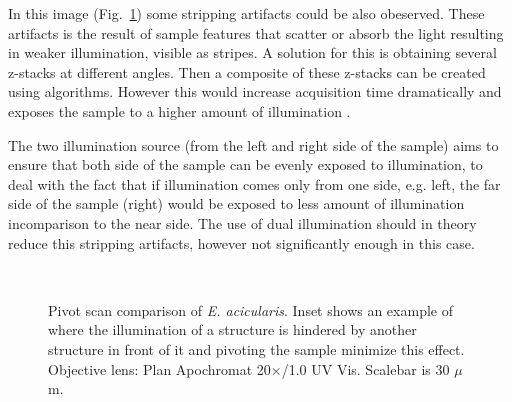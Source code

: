 In this image (Fig.~\ref{fig:Elepiv}) some stripping artifacts could be also obeserved. 
These artifacts is the result of sample features that scatter or absorb the light resulting in weaker illumination, visible as stripes. 
A solution for this is obtaining several z-stacks at different angles. 
Then a composite of these z-stacks can be created using algorithms. 
However this would increase acquisition time dramatically and exposes the sample to a higher amount of illumination \cite{NikonLS}. 

The two illumination source (from the left and right side of the sample) aims to ensure that both side of the sample can be evenly exposed to illumination, to deal with the fact that if illumination comes only from one side, e.g. left, the far side of the sample (right) would be exposed to less amount of illumination incomparison to the near side. 
The use of dual illumination should in theory reduce this stripping artifacts, however not significantly enough in this case. 

\begin{figure}[h!]
\centering
{}\hspace{.1mm}
\\
\caption{Pivot scan comparison of \textit{E. acicularis}. 
Inset shows an example of where the illumination of a structure is hindered by another structure in front of it and pivoting the sample minimize this effect. 
Objective lens: Plan Apochromat 20$\times$/1.0 UV Vis. 
Scalebar is 30 $\mu$m.}
\label{fig:Elepiv}
\end{figure}

